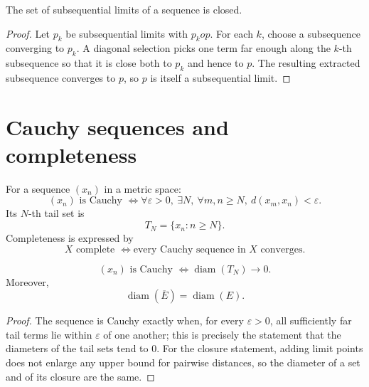 \begin{theorem}
\label{thm:subsequential-limits-closed}
The set of subsequential limits of a sequence is closed.
\begin{proof}
Let $p_k$ be subsequential limits with $p_k	o p$. For each $k$, choose a subsequence converging
to $p_k$. A diagonal selection picks one term far enough along the $k$-th subsequence so that it
is close both to $p_k$ and hence to $p$. The resulting extracted subsequence converges to $p$,
so $p$ is itself a subsequential limit.
\end{proof}
\end{theorem}

\section{Cauchy sequences and completeness}

\begin{definition}
\label{def:cauchy-tail-complete}
For a sequence $(x_n)$ in a metric space:
\[
(x_n)\text{ is Cauchy }
\iff
\forall \varepsilon>0,\ \exists N,\ \forall m,n\ge N,\ d(x_m,x_n)<\varepsilon.
\]
Its $N$-th tail set is
\[
T_N=\{x_n : n\ge N\}.
\]
Completeness is expressed by
\[
X \text{ complete } \iff \text{every Cauchy sequence in }X\text{ converges}.
\]
\end{definition}

\begin{theorem}
\label{thm:cauchy-diameter-criterion}
\[
(x_n)\text{ is Cauchy } \iff \operatorname{diam}(T_N)\to 0.
\]
Moreover,
\[
\operatorname{diam}(\overline{E})=\operatorname{diam}(E).
\]
\begin{proof}
The sequence is Cauchy exactly when, for every $\varepsilon>0$, all sufficiently far tail terms
lie within $\varepsilon$ of one another; this is precisely the statement that the diameters of
the tail sets tend to $0$. For the closure statement, adding limit points does not enlarge any
upper bound for pairwise distances, so the diameter of a set and of its closure are the same.
\end{proof}
\end{theorem}

